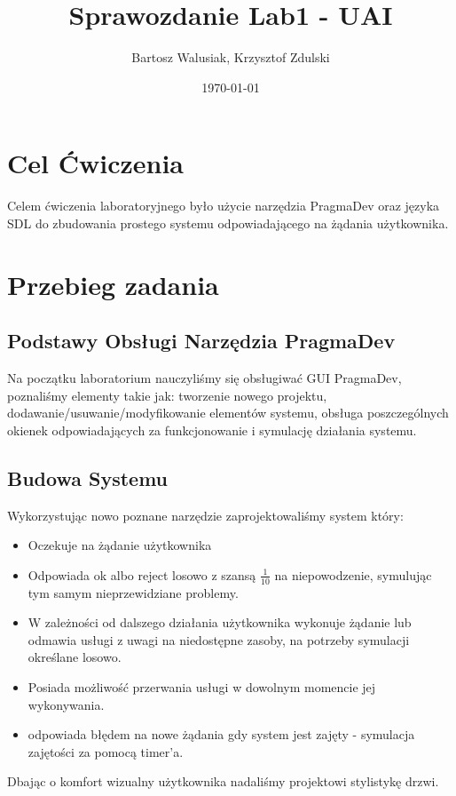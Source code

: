\documentclass[a4paper,12pt]{article}
\begin{document}
    \title{Sprawozdanie Lab1 - UAI}
    \author{Bartosz Walusiak, Krzysztof Zdulski}
    \date{\today}
    \maketitle

    \tableofcontents
    \newpage


    \section{Cel Ćwiczenia}\label{sec:cel-ćwiczenia}

    Celem ćwiczenia laboratoryjnego było użycie narzędzia PragmaDev oraz języka SDL do zbudowania prostego systemu
    odpowiadającego na żądania użytkownika.


    \section{Przebieg zadania}\label{sec:przebieg-zadania}

    \subsection{Podstawy Obsługi Narzędzia PragmaDev}\label{subsec:podstawy-obsługi-narzędzia-pragnadev}

    Na początku laboratorium nauczyliśmy się obsługiwać GUI PragmaDev, poznaliśmy elementy takie jak: tworzenie nowego
    projektu, dodawanie/usuwanie/modyfikowanie elementów systemu, obsługa poszczególnych okienek odpowiadających za
    funkcjonowanie i symulację działania systemu.

    \subsection{Budowa Systemu}\label{subsec:budowa-systemu}

    Wykorzystując nowo poznane narzędzie zaprojektowaliśmy system który:
    \begin{itemize}
        \item Oczekuje na żądanie użytkownika
        \item Odpowiada ok albo reject losowo z szansą $\frac{1}{10}$ na niepowodzenie, symulując tym samym nieprzewidziane problemy.
        \item W zależności od dalszego działania użytkownika wykonuje żądanie lub odmawia usługi z uwagi na niedostępne zasoby, na potrzeby symulacji określane losowo.
        \item Posiada możliwość przerwania usługi w dowolnym momencie jej wykonywania.
        \item odpowiada błędem na nowe żądania gdy system jest zajęty - symulacja zajętości za pomocą timer'a.
    \end{itemize}

    Dbając o komfort wizualny użytkownika nadaliśmy projektowi stylistykę drzwi. %
\end{document}
